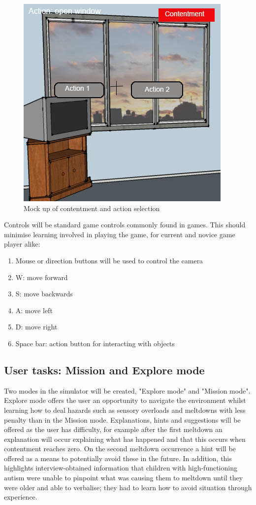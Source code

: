 \documentclass[11pt]{report}
\begin{document}
\begin{figure}[H]
\centering
\includegraphics[scale=0.5]{images/design/interface_actions.jpg}
\caption{Mock up of contentment and action selection}
\label{design_interface_actions}
\end{figure}

Controls will be standard game controls commonly found in games. This should minimise learning involved in playing the game,  for current and novice game player alike: 

\begin{enumerate}
\item Mouse or direction buttons will be used to control the camera
\item W: move forward
\item S: move backwards
\item A: move left
\item D: move right
\item Space bar: action button for interacting with objects
\end{enumerate}

\subsection{User tasks: Mission and Explore mode}
Two modes in the simulator will be created, "Explore mode" and "Mission mode". Explore mode offers the user an opportunity to navigate the environment whilst learning how to deal hazards such as sensory overloads and meltdowns with less penalty than in the Mission mode. Explanations, hints and suggestions will be offered as the user has difficulty, for example after the first meltdown an explanation will occur explaining what has happened and that this occurs when contentment reaches zero. On the second meltdown occurrence a hint will be offered as a means to potentially avoid these in the future. In addition, this highlights interview-obtained information that children with high-functioning autism were unable to pinpoint what was causing them to meltdown until they were older and able to verbalise; they had to learn how to avoid situation through experience. 
\end{document}
